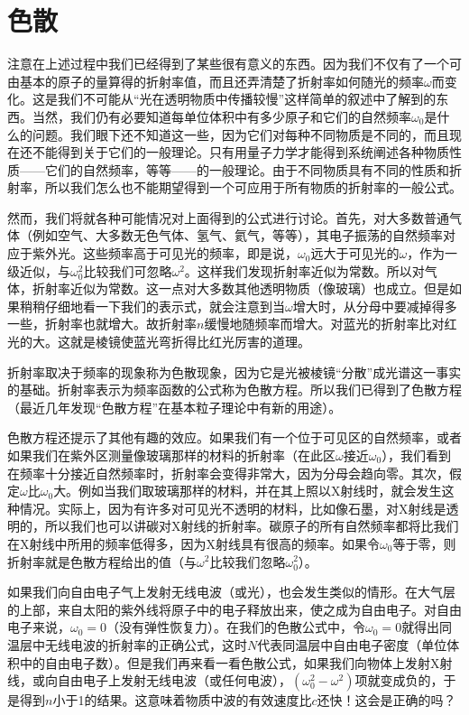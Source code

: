 \section{色散}

注意在上述过程中我们已经得到了某些很有意义的东西。因为我们不仅有了一个可由基本的原子的量算得的折射率值，而且还弄清楚了折射率如何随光的频率$\omega$而变化。这是我们不可能从“光在透明物质中传播较慢”这样简单的叙述中了解到的东西。当然，我们仍有必要知道每单位体积中有多少原子和它们的自然频率$\omega_0$是什么的问题。我们眼下还不知道这一些，因为它们对每种不同物质是不同的，而且现在还不能得到关于它们的一般理论。只有用量子力学才能得到系统阐述各种物质性质——它们的自然频率，等等——的一般理论。由于不同物质具有不同的性质和折射率，所以我们怎么也不能期望得到一个可应用于所有物质的折射率的一般公式。

然而，我们将就各种可能情况对上面得到的公式进行讨论。首先，对大多数普通气体（例如空气、大多数无色气体、氢气、氦气，等等），其电子振荡的自然频率对应于紫外光。这些频率高于可见光的频率，即是说，$\omega_0$远大于可见光的$\omega$，作为一级近似，与$\omega_0^2$比较我们可忽略$\omega^2$。这样我们发现折射率近似为常数。所以对气体，折射率近似为常数。这一点对大多数其他透明物质（像玻璃）也成立。但是如果稍稍仔细地看一下我们的表示式，就会注意到当$\omega$增大时，从分母中要减掉得多一些，折射率也就增大。故折射率$n$缓慢地随频率而增大。对蓝光的折射率比对红光的大。这就是棱镜使蓝光弯折得比红光厉害的道理。

折射率取决于频率的现象称为色散现象，因为它是光被棱镜“分散”成光谱这一事实的基础。折射率表示为频率函数的公式称为色散方程。所以我们已得到了色散方程（最近几年发现“色散方程”在基本粒子理论中有新的用途）。

色散方程还提示了其他有趣的效应。如果我们有一个位于可见区的自然频率，或者如果我们在紫外区测量像玻璃那样的材料的折射率（在此区$\omega$接近$\omega_0$），我们看到在频率十分接近自然频率时，折射率会变得非常大，因为分母会趋向零。其次，假定$\omega$比$\omega_0$大。例如当我们取玻璃那样的材料，并在其上照以X射线时，就会发生这种情况。实际上，因为有许多对可见光不透明的材料，比如像石墨，对X射线是透明的，所以我们也可以讲碳对X射线的折射率。碳原子的所有自然频率都将比我们在X射线中所用的频率低得多，因为X射线具有很高的频率。如果令$\omega_0$等于零，则折射率就是色散方程给出的值（与$\omega^2$比较我们忽略$\omega_0^2$）。

如果我们向自由电子气上发射无线电波（或光），也会发生类似的情形。在大气层的上部，来自太阳的紫外线将原子中的电子释放出来，使之成为自由电子。对自由电子来说，$\omega_0=0$（没有弹性恢复力）。在我们的色散公式中，令$\omega_0=0$就得出同温层中无线电波的折射率的正确公式，这时$N$代表同温层中自由电子密度（单位体积中的自由电子数）。但是我们再来看一看色散公式，如果我们向物体上发射X射线，或向自由电子上发射无线电波（或任何电波），$(\omega_0^2 - \omega^2)$项就变成负的，于是得到$n$小于1的结果。这意味着物质中波的有效速度比$c$还快！这会是正确的吗？

